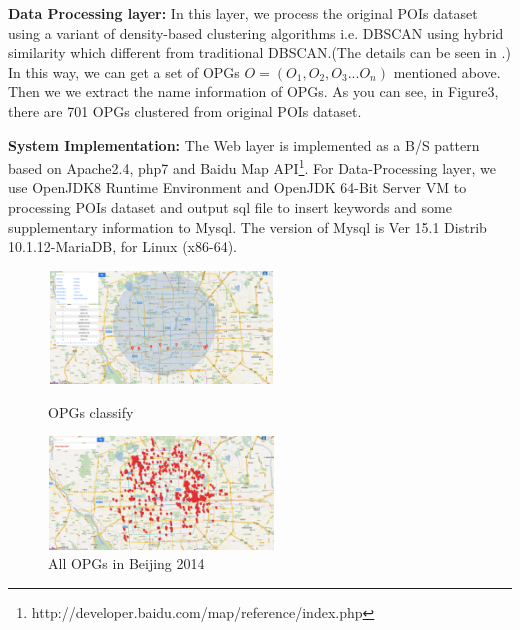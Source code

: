 \documentclass[envcountreset,oribibl]{llncs}
\begin{document}
\textbf{Data Processing layer:}
In this layer, we process the original POIs dataset using a variant of density-based clustering algorithms i.e. DBSCAN using hybrid similarity which different from traditional DBSCAN.(The details can be seen in \cite{Xu15}.) In this way, we can get a set of OPGs $O = (O_1, O_2, O_3... O_n)$ mentioned above. Then we we extract the name information of OPGs. As you can see, in Figure3, there are 701 OPGs clustered from original POIs dataset.

\textbf{System Implementation:} The Web layer is implemented as a B/S pattern based on Apache2.4, php7 and Baidu Map API\footnote{http://developer.baidu.com/map/reference/index.php}. For Data-Processing layer, we use OpenJDK8 Runtime Environment and OpenJDK 64-Bit Server VM to processing POIs dataset and output sql file to insert keywords and some supplementary information to Mysql. The version of Mysql is Ver 15.1 Distrib 10.1.12-MariaDB, for Linux (x86-64).

\begin{figure}
	\begin{minipage}[t]{0.5\linewidth}
		\centering
		\includegraphics[height = 3cm, width = 6cm]{pics/classify.png}
		\caption{OPGs classify}
		\label{fig:1}
	\end{minipage}
	\begin{minipage}[t]{0.5\linewidth}
		\centering
		\includegraphics[height = 3cm, width = 6cm]{pics/OPGs.png}
		\caption{All OPGs in Beijing 2014}
		\label{fig:1}
	\end{minipage}
\end{figure}
\end{document}
